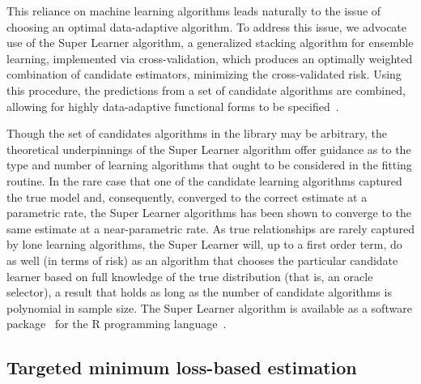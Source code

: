 This reliance on machine learning algorithms leads naturally to the issue of
choosing an optimal data-adaptive algorithm. To address this issue, we advocate
use of the Super Learner algorithm, a generalized stacking algorithm for
ensemble learning, implemented via cross-validation, which produces an optimally
weighted combination of candidate estimators, minimizing the cross-validated
risk. Using this procedure, the predictions from a set of candidate algorithms
are combined, allowing for highly data-adaptive functional forms to be
specified~\cite{van2007super}.

Though the set of candidates algorithms in the library may be arbitrary, the
theoretical underpinnings of the Super Learner algorithm offer guidance as to
the type and number of learning algorithms that ought to be considered in the
fitting routine. In the rare case that one of the candidate learning algorithms
captured the true model and, consequently, converged to the correct estimate at
a parametric rate, the Super Learner algorithms has been shown to converge to
the same estimate at a near-parametric rate. As true relationships are rarely
captured by lone learning algorithms, the Super Learner will, up to a first
order term, do as well (in terms of risk) as an algorithm that chooses the
particular candidate learner based on full knowledge of the true distribution
(that is, an oracle selector), a result that holds as long as the number of
candidate algorithms is polynomial in sample size. The Super Learner algorithm
is available as a software package~\cite{van2007super} for the R programming
language~\cite{R}.

\subsection{Targeted minimum loss-based estimation}\label{tmle}

